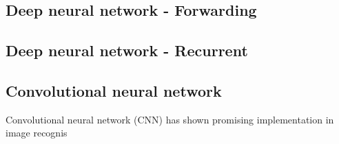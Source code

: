 \subsection{Deep neural network - Forwarding}
\subsection{Deep neural network - Recurrent}
\subsection{Convolutional neural network}
Convolutional neural network (CNN) has shown promising implementation in image recognis